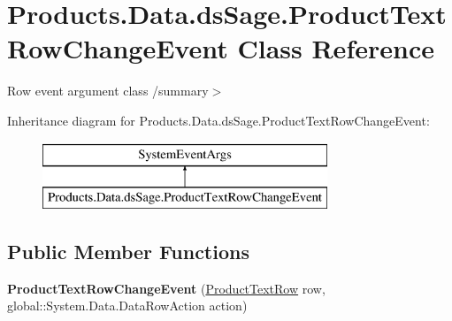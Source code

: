 \hypertarget{class_products_1_1_data_1_1ds_sage_1_1_product_text_row_change_event}{}\section{Products.\+Data.\+ds\+Sage.\+Product\+Text\+Row\+Change\+Event Class Reference}
\label{class_products_1_1_data_1_1ds_sage_1_1_product_text_row_change_event}


Row event argument class /summary$>$  


Inheritance diagram for Products.\+Data.\+ds\+Sage.\+Product\+Text\+Row\+Change\+Event\+:\begin{figure}[H]
\begin{center}
\leavevmode
\includegraphics[height=2.000000cm]{class_products_1_1_data_1_1ds_sage_1_1_product_text_row_change_event}
\end{center}
\end{figure}
\subsection*{Public Member Functions}
\begin{DoxyCompactItemize}
\item 
{\bfseries Product\+Text\+Row\+Change\+Event} (\hyperlink{class_products_1_1_data_1_1ds_sage_1_1_product_text_row}{Product\+Text\+Row} row, global\+::\+System.\+Data.\+Data\+Row\+Action action)\hypertarget{class_products_1_1_data_1_1ds_sage_1_1_product_text_row_change_event_a090fb25159ae9bfd7dbdf6bb9521034f}{}\label{class_products_1_1_data_1_1ds_sage_1_1_product_text_row_change_event_a090fb25159ae9bfd7dbdf6bb9521034f}

\end{DoxyCompactItemize}
